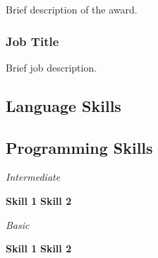 \documentclass[a4paper]{cv-michele}
\begin{document}
\begin{minipage}[t]{0.71\linewidth}



Brief description of the award. 

\vspace{15pt}



\subsubsection*{Job Title}
Brief job description.

\vspace{15pt}



\subsection*{Language Skills}\vspace{2.5pt}

\hspace{5pt}\ob\hspace{5pt} 

\vspace{5pt}

\subsection*{Programming Skills}\vspace{2.5pt}

\noindent\parbox[t]{0.175\textwidth}{\textsl{Intermediate}}
\parbox[t]{0.82\textwidth}{
	\textbf{Skill 1}
	\hspace{2.5pt}\ob\hspace{2.5pt}
	\textbf{Skill 2}
}
\noindent\parbox[t]{0.175\textwidth}{\textsl{Basic}}
\parbox[t]{0.82\textwidth}{
	\textbf{Skill 1}
	\hspace{2.5pt}\ob\hspace{2.5pt}
	\textbf{Skill 2}
}


\end{minipage}
\end{document}
